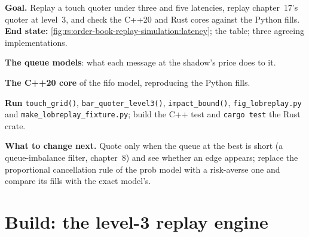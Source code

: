 \begin{tutorial}
\textbf{Goal.} Replay a touch quoter under three  and five latencies, replay chapter~17's  quoter at level~3, and check the C++20
and Rust cores against the Python fills. \textbf{End state:} \cref{fig:rs:order-book-replay-simulation:latency}; the table; three agreeing implementations.
\begin{tutsteps}
\item \textbf{The queue models}: what each message at the shadow's price does to it.
\label{lst:rs:order-book-replay-simulation:models}
\item \textbf{The C++20 core} of the fifo model, reproducing the Python fills.
\label{lst:rs:order-book-replay-simulation:cpp}
\item \textbf{Run} \texttt{touch\_grid()}, \texttt{bar\_quoter\_level3()}, \texttt{impact\_bound()}, \texttt{fig\_lobreplay.py} and \texttt{make\_lobreplay\_fixture.py}; build
the C++ test and \texttt{cargo test} the Rust crate.
\end{tutsteps}
\textbf{What to change next.} Quote only when the queue at the best is short (a queue-imbalance filter, chapter~8) and see whether an edge appears; replace
the proportional cancellation rule of the prob model with a risk-averse one and compare its fills with the exact model's.
\end{tutorial}

\section{Build: the level-3 replay engine}\label{bld:rs:order-book-replay-simulation:lobreplay}

